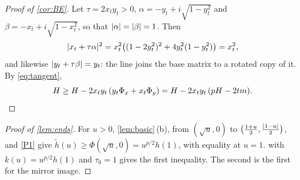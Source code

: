 \begin{proof}[Proof of \cref{cor:BE}]
Let $\tau=2x_ty_t>0$, $\alpha=-y_t+i\sqrt{1-y_t^2}$ and $\beta=-x_t+i\sqrt{1-x_t^2}$, so that
$\lvert \alpha\rvert=\lvert \beta\rvert=1$. Then
\[
  \lvert x_t+\tau\alpha\rvert^2=x_t^2\bigl((1-2y_t^2)^2+4y_t^2(1-y_t^2)\bigr)=x_t^2,
\]
and likewise $\lvert y_t+\tau\beta\rvert=y_t$: the line joins the base matrix to a rotated copy of it.
By \eqref{eq:tangent},
\[
  H\ge H-2x_ty_t\,(y_t\Phi_x+x_t\Phi_y)=H-2x_ty_t\,(pH-2tm). \qedhere
\]
\end{proof}

\begin{proof}[Proof of \cref{lem:ends}]
For $u>0$, \cref{lem:basic}\,(b), from $(\sqrt u,0)$ to
$\bigl(\tfrac{1+u}2,\tfrac{\lvert 1-u\rvert}2\bigr)$, and \ref{P1} give
$\tilde h(u)\ge\Phi(\sqrt u,0)=u^{p/2}h(1)$, with equality at $u=1$. 
with $k(u)=u^{p/2}h(1)$ and $\tau_0=1$ gives the first inequality. The second is the first for
the mirror image.
\end{proof}
